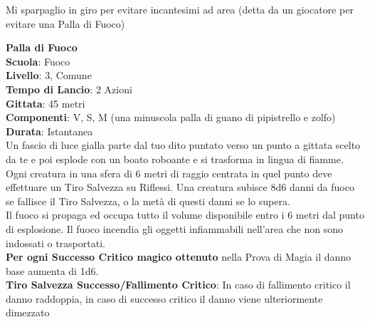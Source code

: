 \begin{multicols}{2}
\medskip

\begin{changemargin}{0.3cm}{0.3cm}\begin{enfasi}{
			Mi sparpaglio in giro per evitare incantesimi ad area (detta da un giocatore per evitare una Palla di Fuoco)
}\end{enfasi}\end{changemargin}

\medskip\textbf{Palla di Fuoco}\\
\textbf{Scuola}: Fuoco\\
\textbf{Livello}: 3, Comune\\
\textbf{Tempo di Lancio}: 2 Azioni\\
\textbf{Gittata}: 45 metri\\
\textbf{Componenti}: V, S, M (una minuscola palla di guano di pipistrello e zolfo)\\
\textbf{Durata}: Istantanea\\
Un fascio di luce gialla parte dal tuo dito puntato verso un punto a gittata scelto da te e poi esplode con un boato roboante e si trasforma in lingua di fiamme.\\
Ogni creatura in una sfera di 6 metri di raggio centrata in quel punto deve effettuare un Tiro Salvezza su Riflessi. Una creatura subisce 8d6 danni da fuoco se fallisce il Tiro Salvezza, o la metà di questi danni se lo supera.\\
Il fuoco si propaga ed occupa tutto il volume disponibile entro i 6 metri dal punto di esplosione. Il fuoco incendia gli oggetti infiammabili nell'area che non sono indossati o trasportati.\\
\textbf{Per ogni Successo Critico magico ottenuto} nella Prova di Magia il danno base aumenta di 1d6.\\
\textbf{Tiro Salvezza Successo/Fallimento Critico}: In caso di fallimento critico il danno raddoppia, in caso di successo critico il danno viene ulteriormente dimezzato


\end{multicols}
